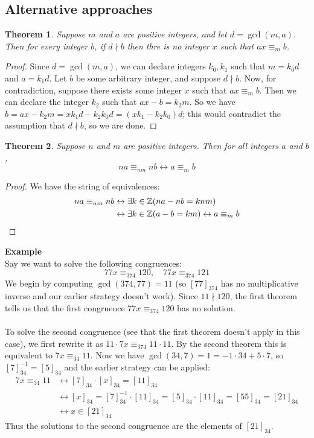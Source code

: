 \documentclass{report}
\newtheorem*{theorem}{Theorem}
\theoremstyle{definition}
\begin{document}
\subsection{Alternative approaches}
\begin{theorem}
Suppose $m$ and $a$ are positive integers, and let $d=\gcd(m,a)$. Then for every integer $b$, if $d\nmid b$ then thre is no integer $x$ such that $ax\equiv_mb$.
\end{theorem}
\begin{proof}
Since $d=\gcd(m,a)$, we can declare integers $k_0,k_1$ such that $m=k_0d$ and $a=k_1d$.
Let $b$ be some arbitrary integer, and suppose $d\nmid b$. Now, for contradiction, suppose there exists some integer $x$ such that $ax\equiv_mb$.
Then we can declare the integer $k_2$ such that $ax-b=k_2m$. So we have $b=ax-k_2m=xk_1d-k_2k_0d=(xk_1-k_2k_0)d$; this would contradict the assumption that $d\nmid b$, so we are done.
\end{proof}
\begin{theorem}
Suppose $n$ and $m$ are positive integers. Then for all integers $a$ and $b$, 
\begin{equation*}
na\equiv_{nm}nb\leftrightarrow a\equiv_mb
\end{equation*}
\end{theorem}
\begin{proof}
We have the string of equivalences:
\begin{align*}
na\equiv_{nm}nb&\leftrightarrow\exists k\in\mathbb Z(na-nb=knm)\\
&\leftrightarrow\exists k\in\mathbb Z(a-b=km)\leftrightarrow a\equiv_mb\qedhere
\end{align*}
\end{proof}
\noindent\textbf{Example}\\
Say we want to solve the following congruences:
\begin{equation*}
77x\equiv_{374}120,\quad77x\equiv_{374}121
\end{equation*}
We begin by computing $\gcd(374,77)=11$ (so $[77]_{374}$ has no multiplicative inverse and our earlier strategy doesn't work). Since $11\nmid120$, the first theorem tells us that the first 
congruence $77x\equiv_{374}120$ has no solution.\\
\vspace{1mm}\\
To solve the second congruence (see that the first theorem doesn't apply in this case), we first rewrite it as $11\cdot7x\equiv_{374}11\cdot11$. By the second theorem this is equivalent to
$7x\equiv_{34}11$. Now we have $\gcd(34,7)=1=-1\cdot34+5\cdot7$, so $[7]^{-1}_{34}=[5]_{34}$ and the earlier strategy can be applied:
\begin{align*}
7x\equiv_{34}11&\leftrightarrow[7]_{34}\cdot[x]_{34}=[11]_{34}\\
&\leftrightarrow[x]_{34}=[7]^{-1}_{34}\cdot[11]_{34}=[5]_{34}\cdot[11]_{34}=[55]_{34}=[21]_{34}\\
&\leftrightarrow x\in[21]_{34}
\end{align*}
Thus the solutions to the second congruence are the elements of $[21]_{34}$.
\newpage
\end{document}
